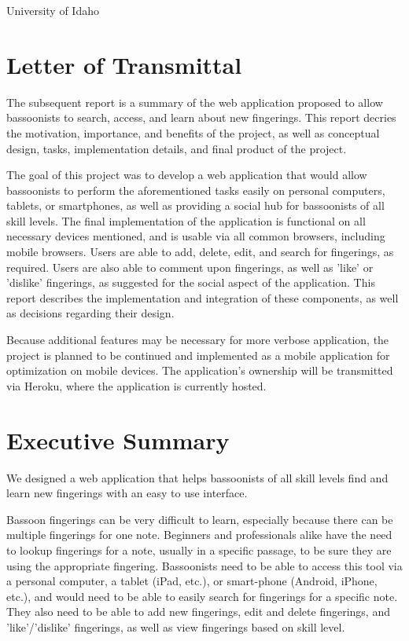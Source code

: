 \documentclass[12pt,english]{article}
\begin{document}
\noindent University of Idaho


\section{Letter of Transmittal}

The subsequent report is a summary of the web application proposed
to allow bassoonists to search, access, and learn about new fingerings.
This report decries the motivation, importance, and benefits of the
project, as well as conceptual design, tasks, implementation details,
and final product of the project. 

The goal of this project was to develop a web application that would
allow bassoonists to perform the aforementioned tasks easily on personal
computers, tablets, or smartphones, as well as providing a social
hub for bassoonists of all skill levels. The final implementation
of the application is functional on all necessary devices mentioned,
and is usable via all common browsers, including mobile browsers.
Users are able to add, delete, edit, and search for fingerings, as
required. Users are also able to comment upon fingerings, as well
as 'like' or 'dislike' fingerings, as suggested for the social aspect
of the application. This report describes the implementation and integration
of these components, as well as decisions regarding their design.

Because additional features may be necessary for more verbose application,
the project is planned to be continued and implemented as a mobile
application for optimization on mobile devices. The application's
ownership will be transmitted via Heroku, where the application is
currently hosted. 


\section{Executive Summary}

We designed a web application that helps bassoonists of all skill
levels find and learn new fingerings with an easy to use interface.

Bassoon fingerings can be very difficult to learn, especially because
there can be multiple fingerings for one note. Beginners and professionals
alike have the need to lookup fingerings for a note, usually in a
specific passage, to be sure they are using the appropriate fingering.
Bassoonists need to be able to access this tool via a personal computer,
a tablet (iPad, etc.), or smart-phone (Android, iPhone, etc.), and
would need to be able to easily search for fingerings for a specific
note. They also need to be able to add new fingerings, edit and delete
fingerings, and 'like'/'dislike' fingerings, as well as view fingerings
based on skill level.
\end{document}
